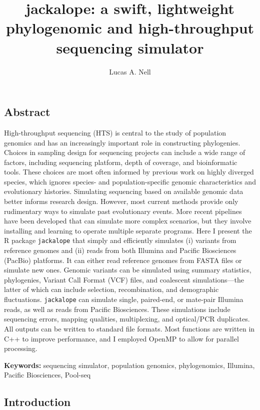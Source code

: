 \documentclass[12pt,]{article}
\title{
    jackalope: a swift, lightweight phylogenomic and high-throughput sequencing simulator
            }
\author[1]{Lucas A. Nell}
\affil[1]{Department of Integrative Biology, University of Wisconsin--Madison}
\date{}
\makeatletter
\def\maketitle{{%
  \renewenvironment{tabular}[2][]
    {\begin{flushleft}}
    {\end{flushleft}}
  \AB@maketitle}}
\makeatother
\begin{document}
            \maketitle
        



\raggedright

\hypertarget{abstract}{%
\subsection{Abstract}\label{abstract}}

High-throughput sequencing (HTS) is central to the study of population genomics
and has an increasingly important role in constructing phylogenies.
Choices in sampling design for sequencing projects can include
a wide range of factors, including sequencing platform, depth of coverage, and
bioinformatic tools.
These choices are most often informed by previous work on highly diverged species,
which ignores species- and population-specific genomic characteristics
and evolutionary histories.
Simulating sequencing based on available genomic data better informs research design.
However, most current methods provide only rudimentary ways to simulate past
evolutionary events.
More recent pipelines have been developed that can simulate more complex scenarios,
but they involve installing and learning to operate multiple separate programs.
Here I present the R package \texttt{jackalope} that simply and efficiently simulates
(i) variants from reference genomes and
(ii) reads from both Illumina and Pacific Biosciences (PacBio) platforms.
It can either read reference genomes from FASTA files or simulate new ones.
Genomic variants can be simulated using summary statistics, phylogenies,
Variant Call Format (VCF) files, and coalescent simulations---the latter of which can
include selection, recombination, and demographic fluctuations.
\texttt{jackalope} can simulate single, paired-end, or mate-pair Illumina reads,
as well as reads from Pacific Biosciences.
These simulations include sequencing errors, mapping qualities, multiplexing,
and optical/PCR duplicates.
All outputs can be written to standard file formats.
Most functions are written in C++ to improve performance, and I employed OpenMP to
allow for parallel processing.

\textbf{Keywords:} sequencing simulator, population genomics, phylogenomics,
Illumina, Pacific Biosciences, Pool-seq

\hypertarget{introduction}{%
\subsection{Introduction}\label{introduction}}
\end{document}
